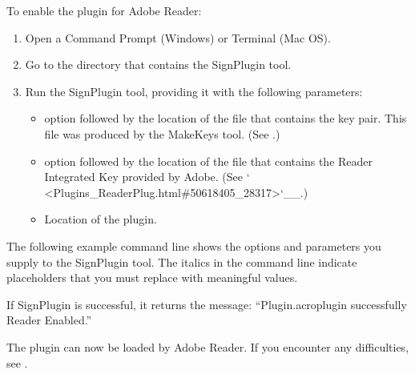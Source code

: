 \documentclass[letterpaper,12pt,english,openany,oneside]{sphinxmanual}
\begin{document}
To enable the plugin for Adobe Reader:
\begin{enumerate}
%
\item {} 
Open a Command Prompt (Windows) or Terminal (Mac OS).

\item {} 
Go to the directory that contains the SignPlugin tool.

\item {} 
Run the SignPlugin tool, providing it with the following parameters:
\begin{itemize}
\item {} 
 option followed by the location of the file that contains the key pair. This file was produced by the MakeKeys tool. (See .)

\item {} 
 option followed by the location of the file that contains the Reader Integrated Key provided by Adobe. (See ` <Plugins\_ReaderPlug.html\#50618405\_28317>`\_\_.)

\item {} 
Location of the plugin.

\end{itemize}

\end{enumerate}

The following example command line shows the options and parameters you supply to the SignPlugin tool. The italics in the command line indicate placeholders that you must replace with meaningful values.

\begin{sphinxVerbatim}[commandchars=\\\{\}]
  
  

\end{sphinxVerbatim}

If SignPlugin is successful, it returns the message: “Plugin.acroplugin successfully Reader Enabled.”

The plugin can now be loaded by Adobe Reader. If you encounter any difficulties, see .
\end{document}
